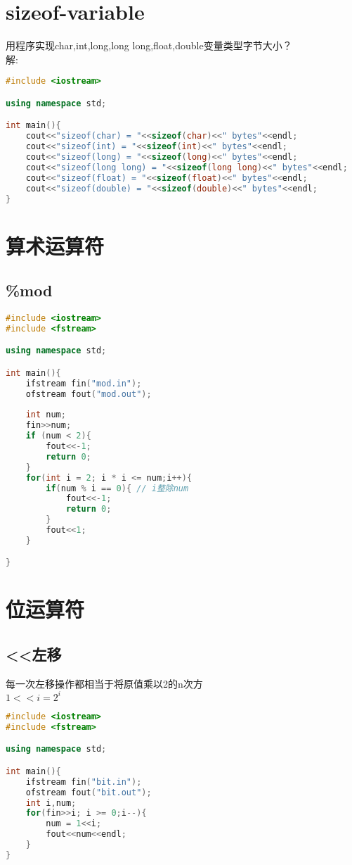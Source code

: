 \documentclass[12pt,twiside,a4paper]{ctexbook}
\numberwithin{chapter}{part}
\begin{document}
\section{sizeof-variable}
用程序实现char,int,long,long long,float,double变量类型字节大小？\\
解:
\begin{lstlisting}[language=C++]
#include <iostream>

using namespace std;

int main(){
	cout<<"sizeof(char) = "<<sizeof(char)<<" bytes"<<endl;
	cout<<"sizeof(int) = "<<sizeof(int)<<" bytes"<<endl;
	cout<<"sizeof(long) = "<<sizeof(long)<<" bytes"<<endl;
	cout<<"sizeof(long long) = "<<sizeof(long long)<<" bytes"<<endl;
	cout<<"sizeof(float) = "<<sizeof(float)<<" bytes"<<endl;
	cout<<"sizeof(double) = "<<sizeof(double)<<" bytes"<<endl;
}
\end{lstlisting}
\section{算术运算符}
\subsection{\%mod}
\begin{lstlisting}[language=C++]
#include <iostream>
#include <fstream>

using namespace std;

int main(){
	ifstream fin("mod.in");
	ofstream fout("mod.out");
	
	int num;
	fin>>num;
	if (num < 2){
		fout<<-1;
		return 0;
	}
	for(int i = 2; i * i <= num;i++){
		if(num % i == 0){ // i整除num
			fout<<-1;
			return 0; 
		}
		fout<<1;
	}

}
\end{lstlisting}

\section{位运算符}
\subsection{<<左移}
每一次左移操作都相当于将原值乘以2的n次方\\
$1<<i = 2^i$
\begin{lstlisting}[language=C++]
#include <iostream>
#include <fstream>

using namespace std;

int main(){
	ifstream fin("bit.in");
	ofstream fout("bit.out");
	int i,num;
	for(fin>>i; i >= 0;i--){
		num = 1<<i; 
		fout<<num<<endl;
	}
}
\end{lstlisting}
\end{document}
